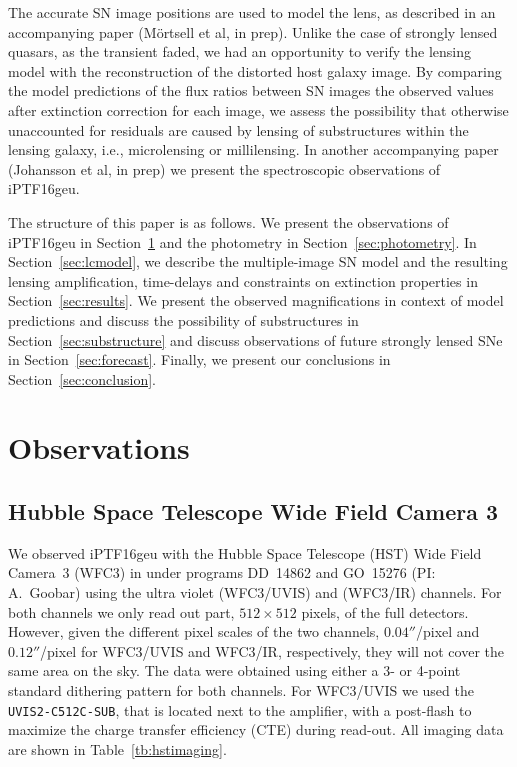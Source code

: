 \documentclass[a4paper,fleqn,usenatbib]{mnras}
\newcommand{\geu}{iPTF16geu\xspace}
\newcommand{\sn}{SN\xspace}
\newcommand{\wfc}{WFC3\xspace}
\newcommand{\wfcuvis}{WFC3/UVIS\xspace}
\newcommand{\wfcir}{WFC3/IR\xspace}
\newcommand{\uvisaperture}{{\tt UVIS2-C512C-SUB}\xspace}
\begin{document}
The accurate \sn image positions are used to model the lens, as described in an accompanying paper (M{\"o}rtsell et al, in prep). Unlike the case of strongly lensed quasars, as the transient faded, we had an opportunity to verify the lensing model with the reconstruction of the distorted host galaxy image. 
By comparing the model predictions of the flux ratios between \sn images the observed values after extinction correction for each image, we assess the possibility that otherwise unaccounted for residuals are caused by lensing of substructures within the lensing galaxy, i.e., microlensing or millilensing.  
In another accompanying paper (Johansson et al, in prep) we present the spectroscopic observations of \geu.

The structure of this paper is as follows. We present the observations of iPTF16geu in Section~\ref{sec:data} and the photometry in Section~\ref{sec:photometry}. In Section~\ref{sec:lcmodel}, we describe the multiple-image SN model and the resulting lensing amplification, time-delays and constraints on extinction properties in Section~\ref{sec:results}. We present the observed magnifications in context of model predictions and discuss the possibility of substructures in Section~\ref{sec:substructure} and discuss observations of future strongly lensed SNe in Section~\ref{sec:forecast}. Finally, we present our conclusions in Section~\ref{sec:conclusion}.
\section{Observations}
\label{sec:data}
\subsection{Hubble Space Telescope Wide Field Camera 3}
We observed \geu with the Hubble Space Telescope (HST) Wide Field Camera~3 (\wfc) in under programs DD~14862 and 
GO~15276 (PI: A.~Goobar) using the ultra violet (\wfcuvis) and (\wfcir) channels.  For both channels we only read out part, 
$512\times512$ pixels, of the full detectors.  However, given the different pixel scales of the two channels, 
$0.04''$/pixel and $0.12''$/pixel for \wfcuvis and \wfcir, respectively, they will not cover the same area on the sky.  
The data were obtained using either a 3- or 4-point standard dithering pattern for both channels.  For \wfcuvis we used 
the \uvisaperture, that is located next to the amplifier, with a post-flash to maximize the charge transfer efficiency (CTE) 
during read-out.  All imaging data are shown in Table~\ref{tb:hstimaging}.
\end{document}

